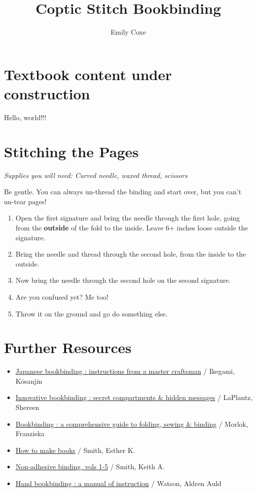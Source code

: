 \documentclass[
  openany]{book}
\title{Coptic Stitch Bookbinding}
\author{Emily Coxe}
\date{}
\providecommand{\tightlist}{%
  \setlength{\itemsep}{0pt}\setlength{\parskip}{0pt}}
\begin{document}
\maketitle

{
\setcounter{tocdepth}{1}
\tableofcontents
}
\chapter{Textbook content under construction}\label{textbook-content-under-construction}

Hello, world!!!

\chapter{Stitching the Pages}\label{stitching-the-pages}

\emph{Supplies you will need: Curved needle, waxed thread, scissors}

Be gentle. You can always un-thread the binding and start over, but you can't un-tear pages!

\begin{enumerate}
\def\labelenumi{\arabic{enumi}.}
\tightlist
\item
  Open the first signature and bring the needle through the first hole, going from the \textbf{outside} of the fold to the inside. Leave 6+ inches loose outside the signature.
\item
  Bring the needle and thread through the second hole, from the inside to the outside.
\item
  Now bring the needle through the second hole on the second signature.
\item
  Are you confused yet? Me too!
\item
  Throw it on the ground and go do something else.
\end{enumerate}

\chapter{Further Resources}\label{further-resources}

\begin{itemize}
\tightlist
\item
  \href{https://search.worldcat.org/title/11866980}{Japanese bookbinding : instructions from a master craftsman} / Ikegami, Kōsanjin
\item
  \href{https://search.worldcat.org/title/37809087}{Innovative bookbinding : secret compartments \& hidden messages} / LaPlantz, Shereen
\item
  \href{https://search.worldcat.org/title/1047524099}{Bookbinding : a comprehensive guide to folding, sewing \& binding} / Morlok, Franziska
\item
  \href{https://search.worldcat.org/title/123349651}{How to make books} / Smith, Esther K.
\item
  \href{https://search.worldcat.org/title/43303159}{Non-adhesive binding, vols 1-5} / Smith, Keith A.
\item
  \href{https://search.worldcat.org/title/964990}{Hand bookbinding : a manual of instruction} / Watson, Aldren Auld
\end{itemize}
\end{document}
